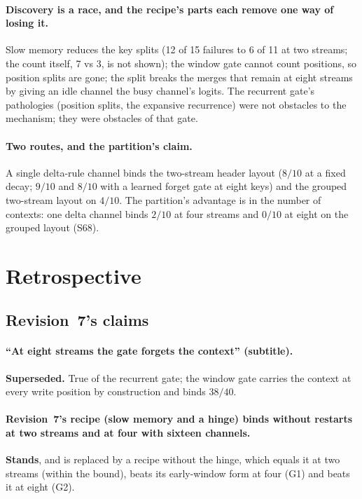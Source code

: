 \documentclass[11pt]{article}
\begin{document}
\paragraph{Discovery is a race, and the recipe's parts each remove one way of losing it.} Slow memory reduces the key splits (12 of 15 failures to 6 of 11 at two streams; the count itself, 7 vs 3, is not shown); the window gate cannot count positions, so position splits are gone; the split breaks the merges that remain at eight streams by giving an idle channel the busy channel's logits. The recurrent gate's pathologies (position splits, the expansive recurrence) were not obstacles to the mechanism; they were obstacles of that gate.

\paragraph{Two routes, and the partition's claim.} A single delta-rule channel binds the two-stream header layout ($8/10$ at a fixed decay; $9/10$ and $8/10$ with a learned forget gate at eight keys) and the grouped two-stream layout on $4/10$. The partition's advantage is in the number of contexts: one delta channel binds $2/10$ at four streams and $0/10$ at eight on the grouped layout (S68).

\section{Retrospective}
\label{sec:retro}

\subsection{Revision~7's claims}

\paragraph{``At eight streams the gate forgets the context'' (subtitle).} \textbf{Superseded.} True of the recurrent gate; the window gate carries the context at every write position by construction and binds $38/40$.

\paragraph{Revision~7's recipe (slow memory and a hinge) binds without restarts at two streams and at four with sixteen channels.} \textbf{Stands}, and is replaced by a recipe without the hinge, which equals it at two streams (within the bound), beats its early-window form at four (G1) and beats it at eight (G2).
\end{document}
